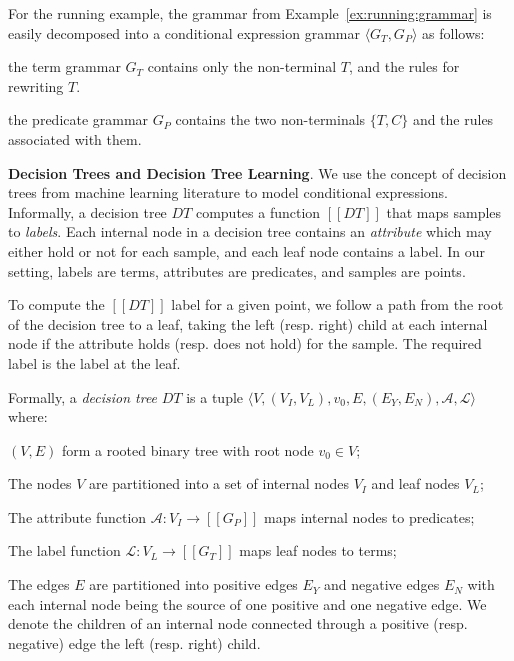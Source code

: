\documentclass{llncs}
\newcommand\tuple[1]{\langle #1 \rangle}
\newcommand\Grammar{G}
\newcommand\sem[1]{[\![ #1 ]\!]}
\newcommand\DecisionTree{\mathit{DT}}
\newcommand\NodesInternal{V_I}
\newcommand\Nodes{V}
\newcommand\node{v}
\newcommand\NodesLeaf{V_L}
\newcommand\EdgesYes{E_Y}
\newcommand\EdgesNo{E_N}
\newcommand\Edges{E}
\newcommand\Attribute{\mathcal{A}}
\newcommand\Label{\mathcal{L}}
\renewcommand{\paragraph}[1]{\par\noindent\textbf{#1}.}
\begin{document}
\begin{example}
  For the running example, the grammar from
  Example~\ref{ex:running:grammar} is easily decomposed into a
  conditional expression grammar $\tuple{\Grammar_T, \Grammar_P}$ as
  follows:
  \begin{inparaenum}[(a)]
  \item the term grammar $\Grammar_T$ contains only the non-terminal
    $T$, and the rules for rewriting $T$.
  \item the predicate grammar $\Grammar_P$ contains the two
    non-terminals $\{ T, C \}$ and the rules associated with them.
  \end{inparaenum}
\end{example}

\paragraph{Decision Trees and Decision Tree Learning}
We use the concept of decision trees from machine learning literature to
model conditional expressions.
Informally, a decision tree $\DecisionTree$ computes a function
$\sem{\DecisionTree}$ that maps samples to {\em labels}.
Each internal node in a decision tree contains an {\em attribute} which
may either hold or not for each sample, and each leaf node contains a
label.
In our setting, labels are terms, attributes are predicates, and samples
are points.

To compute the $\sem{\DecisionTree}$ label for a given point, we follow
a path from the root of the decision tree to a leaf, taking the left
(resp. right) child at each internal node if the attribute holds (resp.
does not hold) for the sample.
The required label is the label at the leaf.

Formally, a {\em decision tree} $\DecisionTree$  is a tuple $\tuple{
\Nodes, (\NodesInternal, \NodesLeaf), \node_0, \Edges, (\EdgesYes,
\EdgesNo), \Attribute, \Label }$ where:
\begin{inparaenum}[(a)]
\item $(\Nodes, \Edges)$ form a rooted binary tree with root node
    $\node_0 \in \Nodes$;
\item The nodes $\Nodes$ are partitioned into a set of internal nodes
    $\NodesInternal$ and leaf nodes $\NodesLeaf$;
\item The attribute function $\Attribute : \NodesInternal \to
    \sem{\Grammar_P}$ maps internal nodes to predicates;
\item The label function $\Label : \NodesLeaf \to \sem{\Grammar_T}$ maps
    leaf nodes to terms;
\item The edges $\Edges$ are partitioned into positive edges $\EdgesYes$
  and negative edges $\EdgesNo$ with each internal node being the source
  of one positive and one negative edge.
  We denote the children of an internal node connected through a
  positive (resp. negative) edge the left (resp. right) child.
\end{inparaenum}
\end{document}
